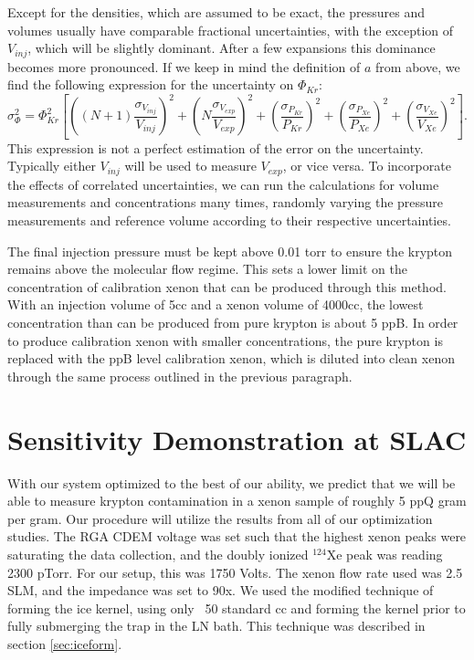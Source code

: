 Except for the densities, which are assumed to be exact, the pressures and volumes usually have comparable fractional uncertainties, with the exception of $V_{inj}$, which will be slightly dominant. After a few expansions this dominance becomes more pronounced. If we keep in mind the definition of $a$ from above, we find the following expression for the uncertainty on $\Phi_{Kr}$:
\begin{equation}
\sigma_{\Phi}^{2} = \Phi_{Kr}^2\left[  \left((N+1)\frac{\sigma_{V_{inj}}}{V_{inj}}\right)^2 + \left(N\frac{\sigma_{V_{exp}}}{V_{exp}}\right)^2  + \left(\frac{\sigma_{P_{Kr}}}{P_{Kr}}\right)^2   + \left(\frac{\sigma_{P_{Xe}}}{P_{Xe}}\right)^2   + \left(\frac{\sigma_{V_{Xe}}}{V_{Xe}}\right)^2  \right].
\end{equation}
This expression is not a perfect estimation of the error on the uncertainty. Typically either $V_{inj}$ will be used to measure $V_{exp}$, or vice versa. To incorporate the effects of correlated uncertainties, we can run the calculations for volume measurements and concentrations many times, randomly varying the pressure measurements and reference volume according to their respective uncertainties.

The final injection pressure must be kept above 0.01 torr to ensure the krypton remains above the molecular flow regime. This sets a lower limit on the concentration of calibration xenon that can be produced through this method. With an injection volume of 5cc and a xenon volume of 4000cc, the lowest concentration than can be produced from pure krypton is about 5 ppB. In order to produce calibration xenon with smaller concentrations, the pure krypton is replaced with the ppB level calibration xenon, which is diluted into clean xenon through the same process outlined in the previous paragraph.



\section{Sensitivity Demonstration at SLAC}
With our system optimized to the best of our ability, we predict that we will be able to measure krypton contamination in a xenon sample of roughly 5 ppQ gram per gram. Our procedure will utilize the results from all of our optimization studies. The RGA CDEM voltage was set such that the highest xenon peaks were saturating the data collection, and the doubly ionized $^{124}$Xe peak was reading 2300 pTorr. For our setup, this was 1750 Volts. The xenon flow rate used was 2.5 SLM, and the impedance was set to 90x. We used the modified technique of forming the ice kernel, using only ~50 standard cc and forming the kernel prior to fully submerging the trap in the LN bath. This technique was described in section \ref{sec:iceform}. 


